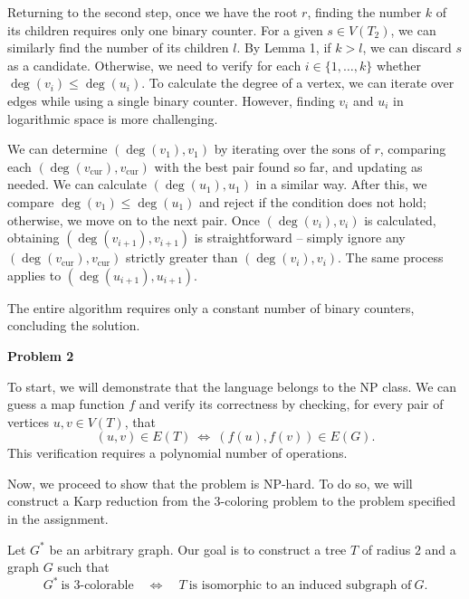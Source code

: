 \documentclass[12pt]{article}
\begin{document}
	\medskip
	
	Returning to the second step, once we have the root \(r\), finding the
	number \(k\) of its children requires only one binary counter. For a given
	\(s \in V(T_{2})\), we can similarly find the number of its children \(l\).
	By Lemma 1, if \(k > l\), we can discard \(s\) as a candidate. Otherwise, we
	need to verify for each \(i \in \{1, \ldots, k\}\) whether \(\deg(v_{i})
	\leqslant \deg(u_{i})\). To calculate the degree of a vertex, we can iterate
	over edges while using a single binary counter. However, finding \(v_{i}\)
	and \(u_{i}\) in logarithmic space is more challenging.
	
	\medskip
	
	We can determine \((\deg(v_{1}), v_{1})\) by iterating over the sons of
	\(r\), comparing each \((\deg(v_{\text{cur}}), v_{\text{cur}})\) with the
	best pair found so far, and updating as needed. We can calculate
	\((\deg(u_{1}), u_{1})\) in a similar way. After this, we compare
	\(\deg(v_{1}) \leqslant \deg(u_{1})\) and reject if the condition does not
	hold; otherwise, we move on to the next pair. Once \((\deg(v_{i}), v_{i})\)
	is calculated, obtaining \((\deg(v_{i + 1}), v_{i + 1})\) is straightforward
	-- simply ignore any \((\deg(v_{\text{cur}}), v_{\text{cur}})\) strictly
	greater than \((\deg(v_{i}), v_{i})\). The same process applies to
	\((\deg(u_{i + 1}), u_{i + 1})\).
	
	\medskip
	
	The entire algorithm requires only a constant number of binary counters,
	concluding the solution.
	
	\bigskip
	
	\textbf{Problem 2}
	
	\medskip
	
	To start, we will demonstrate that the language belongs to the NP class. We
	can guess a map function \(f\) and verify its correctness by checking, for
	every pair of vertices \(u, v \in V(T)\), that
	\[ (u, v) \in E(T) \ \iff \ (f(u), f(v)) \in E(G) \text{.} \]
	This verification requires a polynomial number of operations.
	
	\medskip
	
	Now, we proceed to show that the problem is NP-hard. To do so, we will
	construct a Karp reduction from the \(3\)-coloring problem to the problem
	specified in the assignment.
	
	\medskip
	
	Let \(G^{\ast}\) be an arbitrary graph. Our goal is to construct a tree
	\(T\) of radius \(2\) and a graph \(G\) such that
	\begin{equation} \label{eq:eq2}
		G^{\ast} \ \text{is 3-colorable} \quad \iff \quad T \ \text{is
		isomorphic to an induced subgraph of} \ G \text{.}
	\end{equation}
	
\end{document}
